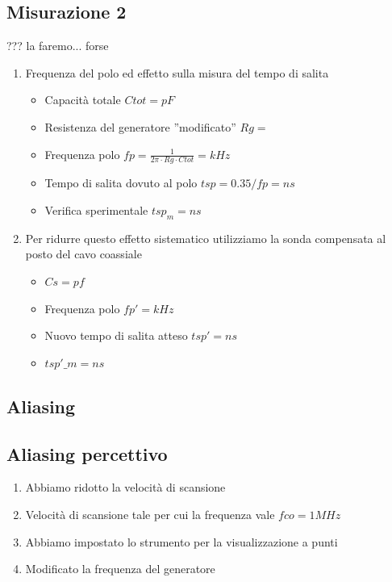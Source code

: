 \documentclass[a4paper]{article}
\begin{document}
\subsection{Misurazione 2}
\colorbox{ProcessBlue}{??? la faremo... forse}

\begin{enumerate}
\item Frequenza del polo ed effetto sulla misura del tempo di salita
  \begin{itemize}
    \item Capacità totale \(Ctot = pF\)
    \item Resistenza del generatore ”modificato” \(Rg= \)
    \item Frequenza polo \(fp = \tfrac{1}{2\pi \cdot Rg \cdot Ctot} = kHz \)
    \item Tempo di salita dovuto al polo \(tsp= 0.35/fp = ns\)
    \item Verifica sperimentale \(tsp_m = ns\)
    \end{itemize}

\item Per ridurre questo effetto sistematico utilizziamo la sonda compensata al posto del cavo coassiale
 \begin{itemize}
 \item  \(Cs= pf\)
 \item Frequenza polo \(fp' = kHz\)
 \item Nuovo tempo di salita atteso \(tsp'= ns\)
 \item \(tsp'\_m= ns\)
 \end{itemize}
\end{enumerate}



\begin{tcolorbox}[breakable,colback=cyan,colframe=cyan]
\section*{Aliasing}
\end{tcolorbox}


\subsection{Aliasing percettivo}
 \begin{enumerate}
  \item Abbiamo ridotto la velocità di scansione
  \item Velocità di scansione tale per cui la frequenza vale \(fco= 1 MHz\)
  \item Abbiamo impostato lo strumento per la visualizzazione a punti
  \item Modificato la frequenza del generatore
 \end{enumerate}
\end{document}
